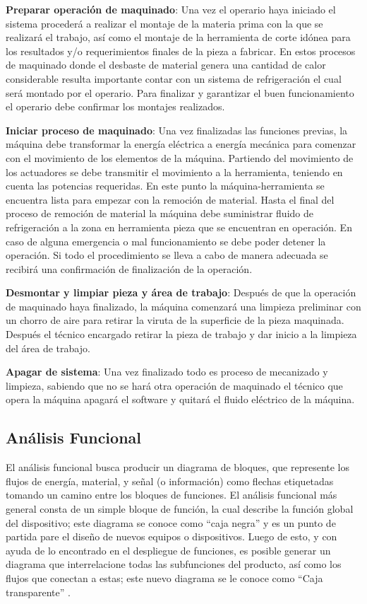 \textbf{Preparar operación de maquinado}: Una vez el operario haya iniciado el sistema procederá a realizar el montaje de la materia prima con la que se realizará el trabajo, así como el montaje de la herramienta de corte idónea para los resultados y/o requerimientos finales de la pieza a fabricar.  En estos procesos de maquinado donde el desbaste de material genera una cantidad de calor considerable resulta importante contar con un sistema de refrigeración el cual será montado por el operario. Para finalizar y garantizar el buen funcionamiento el operario debe confirmar los montajes realizados.

\textbf{Iniciar proceso de maquinado}:  Una vez finalizadas las funciones previas, la máquina debe transformar la energía eléctrica a energía mecánica para comenzar con el movimiento de los elementos de la máquina. Partiendo del movimiento de los actuadores se debe transmitir el movimiento a la herramienta, teniendo en cuenta las potencias requeridas. En este punto la máquina-herramienta se encuentra lista para empezar con la remoción de material. Hasta el final del proceso de remoción de material la máquina debe suministrar fluido de refrigeración a la zona en herramienta pieza que se encuentran en operación. En caso de alguna emergencia o mal funcionamiento se debe poder detener la operación. Si todo el procedimiento se lleva a cabo de manera adecuada se recibirá una confirmación de finalización de la operación. 

\textbf{Desmontar y limpiar pieza y área de trabajo}: Después de que la operación de maquinado haya finalizado, la máquina comenzará una limpieza preliminar con un chorro de aire para retirar la viruta de la superficie de la pieza maquinada. Después el técnico encargado retirar la pieza de trabajo y dar inicio a la limpieza del área de trabajo.

\textbf{Apagar de sistema}: Una vez finalizado todo es proceso de mecanizado y limpieza, sabiendo que no se hará otra operación de maquinado el técnico que opera la máquina apagará el software y quitará el fluido eléctrico de la máquina.

\subsection{Análisis Funcional}
\label{sec:AnalisisFuncional}

El análisis funcional busca producir un diagrama de bloques, que represente los flujos de energía, material, y señal (o información) como flechas etiquetadas tomando un camino entre los bloques de funciones. El análisis funcional más general consta de un simple bloque de función, la cual describe la función global del dispositivo; este diagrama se conoce como \enquote{caja negra} y es un punto de partida pare el diseño de nuevos equipos o dispositivos. Luego de esto, y con ayuda de lo encontrado en el despliegue de funciones, es posible generar un diagrama que interrelacione todas las subfunciones del producto, así como los flujos que conectan a estas; este nuevo diagrama se le conoce como \enquote{Caja transparente} \citep{dieter2012engineering}.

